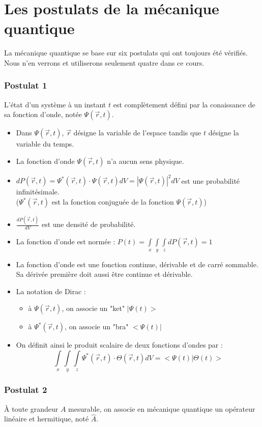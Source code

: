 \documentclass[../main.tex]{subfile}
\begin{document}
\part{Les postulats de la mécanique quantique}
La mécanique quantique se base sur six postulats qui ont toujours été vérifiés. Nous n'en verrons et utiliserons seulement quatre dans ce cours.

\section{Postulat 1}
L'état d'un système à un instant $t$ est complètement défini par la conaissance de sa fonction d'onde, notée $\Psi (\vec{r}, t)$.

\begin{itemize}
	\item Dans $\Psi (\vec{r}, t)$, $\vec{r}$ désigne la variable de l'espace tandis que $t$ désigne la variable du temps.
	\item La fonction d'onde $\Psi(\vec{r}, t)$ n'a aucun sens physique.
	\item $dP(\vec{r}, t) = \Psi^*(\vec{r}, t) \cdot \Psi(\vec{r}, t) dV = |\Psi(\vec{r}, t)|^2 dV$ est une probabilité infinitésimale.
	\\($\Psi^*(\vec{r}, t)$ est la fonction conjuguée de la fonction $\Psi(\vec{r}, t)$)
	\item $\frac{dP(\vec{r}, t)}{dV}$ est une densité de probabilité.
	\item La fonction d'onde est normée : $P(t) = \int\limits_{x}\int\limits_{y}\int\limits_{z} dP(\vec{r}, t) = 1$
	\item La fonction d'onde est une fonction continue, dérivable et de carré sommable. Sa dérivée première doit aussi être continue et dérivable.
	\item La notation de Dirac : \\
	\begin{itemize}
		\item à $\Psi(\vec{r}, t)$, on associe un "ket" $|\Psi(t)>$
		\item à $\Psi^*(\vec{r}, t)$, on associe un "bra" $<\Psi(t)|$
	\end{itemize}
	\item On définit ainsi le produit scalaire de deux fonctions d'ondes par :
	$$\int\limits_{x}\int\limits_{y}\int\limits_{z} \Psi^*(\vec{r}, t) \cdot \Theta(\vec{r}, t) dV = <\Psi(t) | \Theta(t)>$$
\end{itemize}


\section{Postulat 2}
\`A toute grandeur $A$ mesurable, on associe en mécanique quantique un opérateur linéaire et hermitique, noté $\hat{A}$.
\end{document}
